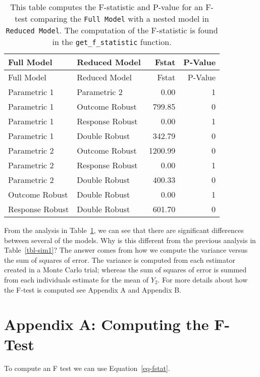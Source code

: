 \documentclass[
  letterpaper,
  DIV=11,
  numbers=noendperiod]{scrartcl}
\begin{document}
\hypertarget{tbl-fstat}{}
\begin{longtable}[]{@{}llrr@{}}
\caption{\label{tbl-fstat}This table computes the F-statistic and
P-value for an F-test comparing the \texttt{Full\ Model} with a nested
model in \texttt{Reduced\ Model}. The computation of the F-statistic is
found in the \texttt{get\_f\_statistic} function.}\tabularnewline
\toprule\noalign{}
Full Model & Reduced Model & Fstat & P-Value \\
\midrule\noalign{}
\endfirsthead
\toprule\noalign{}
Full Model & Reduced Model & Fstat & P-Value \\
\midrule\noalign{}
\endhead
\bottomrule\noalign{}
\endlastfoot
Parametric 1 & Parametric 2 & 0.00 & 1 \\
Parametric 1 & Outcome Robust & 799.85 & 0 \\
Parametric 1 & Response Robust & 0.00 & 1 \\
Parametric 1 & Double Robust & 342.79 & 0 \\
Parametric 2 & Outcome Robust & 1200.99 & 0 \\
Parametric 2 & Response Robust & 0.00 & 1 \\
Parametric 2 & Double Robust & 400.33 & 0 \\
Outcome Robust & Double Robust & 0.00 & 1 \\
Response Robust & Double Robust & 601.70 & 0 \\
\end{longtable}

From the analysis in Table~\ref{tbl-fstat}, we can see that there are
significant differences between several of the models. Why is this
different from the previous analysis in Table~\ref{tbl-sim1}? The answer
comes from how we compute the variance versus the sum of squares of
error. The variance is computed from each estimator created in a Monte
Carlo trial; whereas the sum of squares of error is summed from each
individuals estimate for the mean of \(Y_2\). For more details about how
the F-test is computed see Appendix A and Appendix B.

\newpage{}

\hypertarget{appendix-a-computing-the-f-test}{%
\section{Appendix A: Computing the
F-Test}\label{appendix-a-computing-the-f-test}}

To compute an F test we can use Equation~\ref{eq-fstat}.
\end{document}
